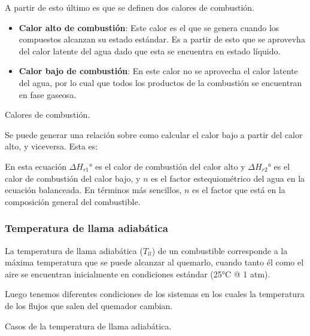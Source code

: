 A partir de esto último es que se definen dos calores de combustión.

\begin{itemize}
    \item \textbf{Calor alto de combustión}: Este calor es el que se genera cuando los compuestos alcanzan su estado estándar. Es a partir de esto que se aprovevha del calor latente del agua dado que esta se encuentra en estado líquido.
    \item \textbf{Calor bajo de combustión}: En este calor no se aprovecha el calor latente del agua, por lo cual que todos los productos de la combustión se encuentran en fase gaseosa.
\end{itemize}

\begin{images}[\label{imagenmultiple}]{Calores de combustión.}
\end{images}

Se puede generar una relación sobre como calcular el calor bajo a partir del calor alto, y viceversa. Esta es:


En esta ecuación $\Delta H_{r1}°$ es el calor de combustión del calor alto y $\Delta H_{r2}°$ es el calor de combustión del calor bajo, y $n$ es el factor estequiométrico del agua en la ecuación balanceada. En términos más sencillos, $n$ es el factor que está en la composición general del combustible.

\subsubsection{Temperatura de llama adiabática}

La temperatura de llama adiabática ($T_{ll}$) de un combustible corresponde a la máxima temperatura que se puede alcanzar al quemarlo, cuando tanto él como el aire se encuentran inicialmente en condiciones estándar (25°C @ 1 atm).


Luego tenemos diferentes condiciones de los sistemas en los cuales la temperatura de los flujos que salen del quemador cambian.

\begin{images}[\label{imagenmultiple}]{Casos de la temperatura de llama adiabática.}
\end{images}

